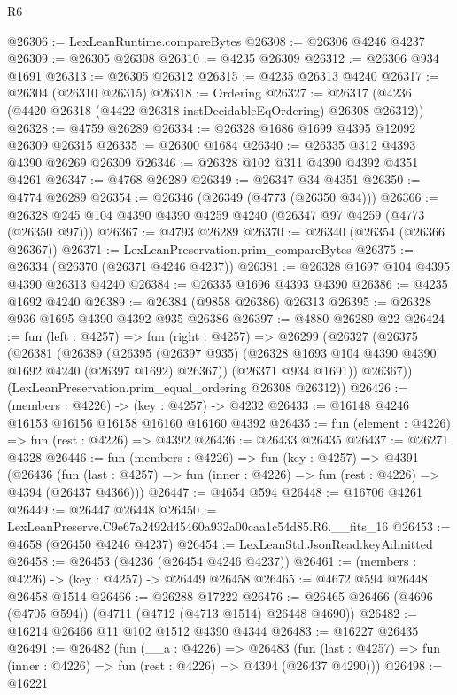 \begin{lexlean}{R6}
\begin{coremodule}
@26306 := LexLeanRuntime.compareBytes
@26308 := @26306 @4246 @4237
@26309 := @26305 @26308
@26310 := @4235 @26309
@26312 := @26306 @934 @1691
@26313 := @26305 @26312
@26315 := @4235 @26313 @4240
@26317 := @26304 (@26310 @26315)
@26318 := Ordering
@26327 := @26317 (@4236 (@4420 @26318 (@4422 @26318 instDecidableEqOrdering) @26308 @26312))
@26328 := @4759 @26289
@26334 := @26328 @1686 @1699 @4395 @12092 @26309 @26315
@26335 := @26300 @1684
@26340 := @26335 @312 @4393 @4390 @26269 @26309
@26346 := @26328 @102 @311 @4390 @4392 @4351 @4261
@26347 := @4768 @26289
@26349 := @26347 @34 @4351
@26350 := @4774 @26289
@26354 := @26346 (@26349 (@4773 (@26350 @34)))
@26366 := @26328 @245 @104 @4390 @4390 @4259 @4240 (@26347 @97 @4259 (@4773 (@26350 @97)))
@26367 := @4793 @26289
@26370 := @26340 (@26354 (@26366 @26367))
@26371 := LexLeanPreservation.prim_compareBytes
@26375 := @26334 (@26370 (@26371 @4246 @4237))
@26381 := @26328 @1697 @104 @4395 @4390 @26313 @4240
@26384 := @26335 @1696 @4393 @4390
@26386 := @4235 @1692 @4240
@26389 := @26384 (@9858 @26386) @26313
@26395 := @26328 @936 @1695 @4390 @4392 @935 @26386
@26397 := @4880 @26289 @22
@26424 := fun (left : @4257) =>
  fun (right : @4257) =>
  @26299
    (@26327
      (@26375
        (@26381
          (@26389
            (@26395 (@26397 @935) (@26328 @1693 @104 @4390 @4390 @1692 @4240 (@26397 @1692) @26367))
            (@26371 @934 @1691))
          @26367))
      (LexLeanPreservation.prim_equal_ordering @26308 @26312))
@26426 := (members : @4226) -> (key : @4257) -> @4232
@26433 := @16148 @4246 @16153 @16156 @16158 @16160 @16160 @4392
@26435 := fun (element : @4226) => fun (rest : @4226) => @4392
@26436 := @26433 @26435
@26437 := @26271 @4328
@26446 := fun (members : @4226) =>
  fun (key : @4257) =>
  @4391
    (@26436
      (fun (last : @4257) => fun (inner : @4226) => fun (rest : @4226) => @4394 (@26437 @4366)))
@26447 := @4654 @594
@26448 := @16706 @4261
@26449 := @26447 @26448
@26450 := LexLeanPreserve.C9e67a2492d45460a932a00caa1c54d85.R6.__fits_16
@26453 := @4658 (@26450 @4246 @4237)
@26454 := LexLeanStd.JsonRead.keyAdmitted
@26458 := @26453 (@4236 (@26454 @4246 @4237))
@26461 := (members : @4226) -> (key : @4257) -> @26449 @26458
@26465 := @4672 @594 @26448 @26458 @1514
@26466 := @26288 @17222
@26476 := @26465 @26466 (@4696 (@4705 @594)) (@4711 (@4712 (@4713 @1514) @26448 @4690))
@26482 := @16214 @26466 @11 @102 @1512 @4390 @4344
@26483 := @16227 @26435
@26491 := @26482
    (fun (__a : @4226) =>
    @26483
      (fun (last : @4257) => fun (inner : @4226) => fun (rest : @4226) => @4394 (@26437 @4290)))
@26498 := @16221

\end{coremodule}
\end{lexlean}
